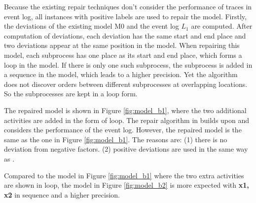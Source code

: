 Because the existing repair techniques  \cite{fahland2015model} don't consider the performance of traces in event log, all instances with positive labels are used to repair the model. Firstly, the deviations of the existing model M0 and the event log $L_1$ are computed. After computation of deviations, each deviation has the same start and end place and two deviations appear at the same position in the model. When repairing this model, each subprocess has one place as its start and end place, which forms a loop in the model. If there is only one such subprocess, the subprocess is added in a sequence in the model, which leads to a higher precision. Yet the algorithm does not discover orders between different subprocesses at overlapping locations. So the subprocesses are kept in a loop form. 

The repaired model is shown in Figure \ref{fig:model_b1}, where the two additional activities are added in the form of loop. The repair algorithm in  \cite{dees2017enhancing} builds upon  \cite{fahland2015model} and considers the performance of the event log. However, the repaired model is the same as the one in Figure \ref{fig:model_b1}. The reasons are: (1) there is no deviation from negative factors. (2) positive deviations are used in the same way as  \cite{fahland2015model}. 

Compared to the model in Figure \ref{fig:model_b1} where the two extra activities are shown in loop, the model in Figure \ref{fig:model_b2} is more expected with \textbf{x1, x2} in sequence and a higher precision.

